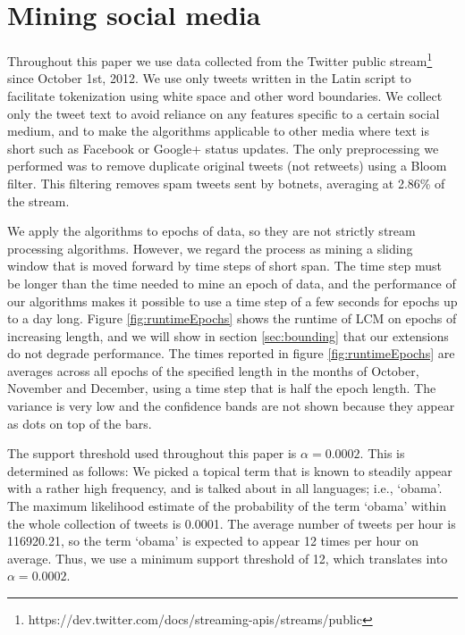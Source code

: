\documentclass{sig-alternate}
\begin{document}
\section{Mining social media}
\label{sec:socmine}

Throughout this paper we use data collected from the Twitter public
stream\footnote{https://dev.twitter.com/docs/streaming-apis/streams/public}
since October 1st, 2012. 
We use only tweets written in the Latin script to facilitate tokenization
using white space and other word boundaries.
We collect only the tweet text to avoid reliance on any features specific to a
certain social medium,
and to make the algorithms applicable to other media where text is short such
as Facebook or Google+ status updates.
The only preprocessing we performed was to remove duplicate original tweets
(not retweets) using a Bloom filter.
This filtering removes spam tweets sent by botnets, averaging at 2.86\% of the stream. 

We apply the algorithms to epochs of data, so they are not strictly stream
processing algorithms.
However, we regard the process as mining a sliding window that is moved
forward by time steps of short span.
The time step must be longer than the time needed to mine an epoch of data,
and the performance of our algorithms makes it possible to use a time step
of a few seconds for epochs up to a day long.
Figure \ref{fig:runtimeEpochs} shows the runtime of LCM on epochs of
increasing length, and we will show in section \ref{sec:bounding} that our
extensions do not degrade performance.
The times reported in figure \ref{fig:runtimeEpochs} are averages across all
epochs of the specified length in the months of October, November and December,
using a time step that is half the epoch length.
The variance is very low and the confidence bands are not shown because they
appear as dots on top of the bars. 

The support threshold used throughout this paper%
is $\alpha=0.0002$.
This is determined as follows: We picked a topical term that is known to
steadily appear with a rather high frequency, and is talked about in all
languages; i.e., `obama'.
The maximum likelihood estimate of the probability of the term `obama' within
the whole collection of tweets is 0.0001.
The average number of tweets per hour is 116920.21, so the term `obama' is
expected to appear 12 times per hour on average.
Thus, we use a minimum support threshold of 12, which translates into
$\alpha = 0.0002$.
\end{document}
